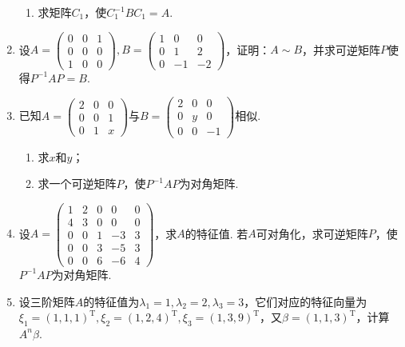 \begin{enumerate}
\begin{enumerate}
              \item 求矩阵$C_1$，使$C_1^{-1}BC_1=A$.
          \end{enumerate}

    \item 设$A=\begin{pmatrix}
                  0 & 0 & 1 \\ 0 & 0 & 0 \\ 1 & 0 & 0
              \end{pmatrix},B=\begin{pmatrix}
                  1 & 0 & 0 \\ 0 & 1 & 2 \\ 0 & -1 & -2
              \end{pmatrix}$，证明：$A\sim B$，并求可逆矩阵$P$使得$P^{-1}AP=B$.

    \item 已知$A=\begin{pmatrix}
                  2 & 0 & 0 \\ 0 & 0 & 1 \\ 0 & 1 & x
              \end{pmatrix}$与$B=\begin{pmatrix}
                  2 & 0 & 0 \\ 0 & y & 0 \\ 0 & 0 & -1
              \end{pmatrix}$相似.
          \begin{enumerate}
              \item 求$x$和$y$；

              \item 求一个可逆矩阵$P$，使$P^{-1}AP$为对角矩阵.
          \end{enumerate}

    \item 设$A=\begin{pmatrix}
                  1 & 2 & 0 & 0  & 0 \\ 4 & 3 & 0 & 0 & 0 \\ 0 & 0 & 1 & -3 & 3 \\ 0 & 0 & 3 & -5 & 3 \\
                  0 & 0 & 6 & -6 & 4
              \end{pmatrix}$，求$A$的特征值. 若$A$可对角化，求可逆矩阵$P$，使$P^{-1}AP$为对角矩阵.

    \item 设三阶矩阵$A$的特征值为$\lambda_1=1,\lambda_2=2,\lambda_3=3$，它们对应的特征向量为$\xi_1=(1,1,1)^\mathrm{T}, \xi_2=(1,2,4)^\mathrm{T},\xi_3=(1,3,9)^\mathrm{T}$，又$\beta=(1,1,3)^\mathrm{T}$，计算$A^n\beta$.


\end{enumerate}
